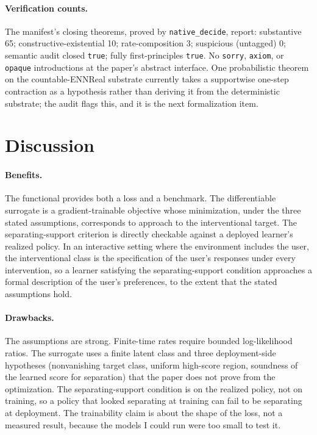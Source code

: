 \documentclass[11pt]{article}
\begin{document}
\paragraph{Verification counts.} The manifest's closing theorems, proved by \texttt{native\_decide}, report: substantive 65; constructive-existential 10; rate-composition 3; suspicious (untagged) 0; semantic audit closed \texttt{true}; fully first-principles \texttt{true}. No \texttt{sorry}, \texttt{axiom}, or \texttt{opaque} introductions at the paper's abstract interface. One probabilistic theorem on the countable-ENNReal substrate currently takes a supportwise one-step contraction as a hypothesis rather than deriving it from the deterministic substrate; the audit flags this, and it is the next formalization item.

\section{Discussion}

\paragraph{Benefits.} The functional provides both a loss and a benchmark. The differentiable surrogate is a gradient-trainable objective whose minimization, under the three stated assumptions, corresponds to approach to the interventional target. The separating-support criterion is directly checkable against a deployed learner's realized policy. In an interactive setting where the environment includes the user, the interventional class is the specification of the user's responses under every intervention, so a learner satisfying the separating-support condition approaches a formal description of the user's preferences, to the extent that the stated assumptions hold.

\paragraph{Drawbacks.} The assumptions are strong. Finite-time rates require bounded log-likelihood ratios. The surrogate uses a finite latent class and three deployment-side hypotheses (nonvanishing target class, uniform high-score region, soundness of the learned score for separation) that the paper does not prove from the optimization. The separating-support condition is on the realized policy, not on training, so a policy that looked separating at training can fail to be separating at deployment. The trainability claim is about the shape of the loss, not a measured result, because the models I could run were too small to test it.
\end{document}
